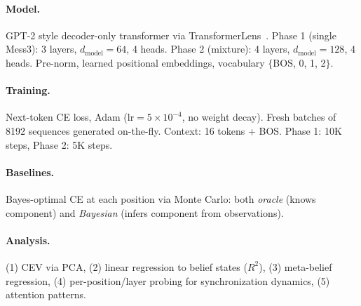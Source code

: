 \paragraph{Model.} GPT-2 style decoder-only transformer via TransformerLens~\cite{nanda2022transformerlens}. Phase 1 (single Mess3): 3 layers, $d_{\text{model}}=64$, 4 heads. Phase 2 (mixture): 4 layers, $d_{\text{model}}=128$, 4 heads. Pre-norm, learned positional embeddings, vocabulary $\{$BOS, 0, 1, 2$\}$.

\paragraph{Training.} Next-token CE loss, Adam ($\text{lr}=5\times10^{-4}$, no weight decay). Fresh batches of 8192 sequences generated on-the-fly. Context: 16 tokens + BOS. Phase 1: 10K steps, Phase 2: 5K steps.

\paragraph{Baselines.} Bayes-optimal CE at each position via Monte Carlo: both \emph{oracle} (knows component) and \emph{Bayesian} (infers component from observations).

\paragraph{Analysis.} (1) CEV via PCA, (2) linear regression to belief states ($R^2$), (3) meta-belief regression, (4) per-position/layer probing for synchronization dynamics, (5) attention patterns.
